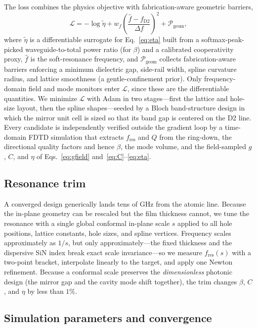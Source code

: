 \documentclass[%
 reprint,
 amsmath,amssymb,
 aps,prx,
 superscriptaddress,
]{revtex4-2}
\begin{document}
The loss combines the physics objective with fabrication-aware geometric barriers,
\begin{equation}
\mathcal L = -\log\tilde\eta
+ w_f\!\left(\frac{\hat f-f_\mathrm{D2}}{\Delta f}\right)^2
+ \mathcal P_\mathrm{geom},
\label{eq:loss}
\end{equation}
where $\tilde\eta$ is a differentiable surrogate for Eq.~\eqref{eq:eta} built from
a softmax-peak-picked waveguide-to-total power ratio (for $\beta$) and a
calibrated cooperativity proxy, $\hat f$ is the soft-resonance frequency, and
$\mathcal P_\mathrm{geom}$ collects fabrication-aware barriers enforcing a minimum
dielectric gap, side-rail width, spline curvature radius, and lattice smoothness
(a gentle-confinement prior). Only
frequency-domain field and mode monitors enter $\mathcal L$, since these are the
differentiable quantities. We minimize $\mathcal L$ with Adam in two stages---first
the lattice and hole-size layout, then the spline shapes---seeded by a Bloch
band-structure design in which the mirror unit cell is sized so that its band gap
is centered on the D2 line. Every candidate is independently verified outside the
gradient loop by a time-domain FDTD simulation that extracts $f_\mathrm{res}$ and
$Q$ from the ring-down, the directional quality factors and hence $\beta$, the
mode volume, and the field-sampled $g$, $C$, and $\eta$ of Eqs.~\eqref{eq:gfield}
and~\eqref{eq:C}--\eqref{eq:eta}.

\subsection{Resonance trim}

A converged design generically lands tens of GHz from the atomic line. Because the
in-plane geometry can be rescaled but the film thickness cannot, we tune the
resonance with a single global conformal in-plane scale $s$ applied to all hole
positions, lattice constants, hole sizes, and spline vertices. Frequency scales
approximately as $1/s$, but only approximately---the fixed thickness and the
dispersive SiN index break exact scale invariance---so we measure
$f_\mathrm{res}(s)$ with a two-point bracket, interpolate linearly to the target,
and apply one Newton refinement. Because a conformal scale preserves the
\emph{dimensionless} photonic design (the mirror gap and the cavity mode shift
together), the trim changes $\beta$, $C$, and $\eta$ by less than $1\%$.

\subsection{Simulation parameters and convergence}
\end{document}
